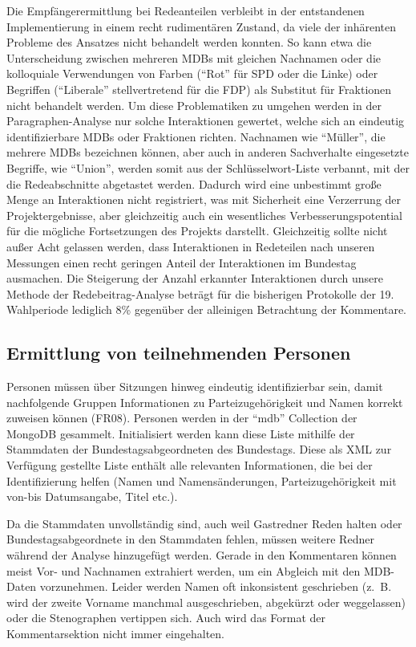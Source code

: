 Die Empfängerermittlung bei Redeanteilen verbleibt in der entstandenen
Implementierung in einem recht rudimentären Zustand, da viele der inhärenten
Probleme des Ansatzes nicht behandelt werden konnten. So kann etwa die
Unterscheidung zwischen mehreren MDBs mit gleichen Nachnamen oder die
kolloquiale Verwendungen von Farben (\enquote{Rot} für SPD oder die Linke) oder
Begriffen (\enquote{Liberale} stellvertretend für die FDP) als Substitut für
Fraktionen nicht behandelt werden. Um diese Problematiken zu umgehen
werden in der Paragraphen-Analyse nur solche Interaktionen gewertet,
welche sich an eindeutig identifizierbare MDBs oder Fraktionen richten.
Nachnamen wie \enquote{Müller}, die mehrere MDBs bezeichnen können, aber auch in
anderen Sachverhalte eingesetzte Begriffe, wie \enquote{Union}, werden somit aus der
Schlüsselwort-Liste verbannt, mit der die Redeabschnitte abgetastet werden.
Dadurch wird eine unbestimmt große Menge an Interaktionen nicht registriert,
was mit Sicherheit eine Verzerrung der Projektergebnisse, aber gleichzeitig
auch ein wesentliches Verbesserungspotential für die mögliche Fortsetzungen
des Projekts darstellt. Gleichzeitig sollte nicht außer Acht gelassen werden,
dass Interaktionen in Redeteilen nach unseren Messungen einen recht geringen
Anteil der Interaktionen im Bundestag ausmachen. Die Steigerung der Anzahl
erkannter Interaktionen durch unsere Methode der Redebeitrag-Analyse beträgt
für die bisherigen Protokolle der 19. Wahlperiode lediglich 8\% gegenüber der
alleinigen Betrachtung der Kommentare.

\subsection{Ermittlung von teilnehmenden Personen}
Personen müssen über Sitzungen hinweg eindeutig identifizierbar sein, damit
nachfolgende Gruppen Informationen zu Parteizugehörigkeit und Namen korrekt
zuweisen können (FR08). Personen werden in der \enquote{mdb} Collection der MongoDB
gesammelt. Initialisiert werden kann diese Liste mithilfe der Stammdaten der
Bundestagsabgeordneten des Bundestags. Diese als XML zur Verfügung gestellte
Liste enthält alle relevanten Informationen, die bei der Identifizierung
helfen (Namen und Namensänderungen, Parteizugehörigkeit mit von-bis
Datumsangabe, Titel etc.).

Da die Stammdaten unvollständig sind, auch weil Gastredner Reden halten oder
Bundestagsabgeordnete in den Stammdaten fehlen, müssen weitere Redner während
der Analyse hinzugefügt werden. Gerade in den Kommentaren können meist Vor-
und Nachnamen extrahiert werden, um ein Abgleich mit den MDB-Daten
vorzunehmen. Leider werden Namen oft inkonsistent geschrieben (z.~B. wird
der zweite Vorname manchmal ausgeschrieben, abgekürzt oder weggelassen) oder
die Stenographen vertippen sich. Auch wird das Format der Kommentarsektion
nicht immer eingehalten.

